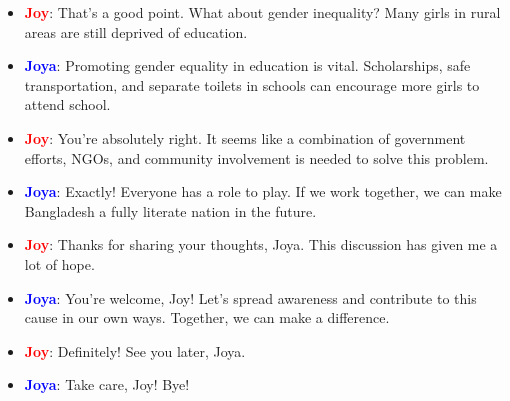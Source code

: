 \documentclass{article}
\begin{document}
\begin{itemize}
    \item \textbf{\textcolor{red}{Joy}}: That’s a good point. What about gender inequality? Many girls in rural areas are still deprived of education.
    \item \textbf{\textcolor{blue}{Joya}}: Promoting gender equality in education is vital. Scholarships, safe transportation, and separate toilets in schools can encourage more girls to attend school.
    \item \textbf{\textcolor{red}{Joy}}: You’re absolutely right. It seems like a combination of government efforts, NGOs, and community involvement is needed to solve this problem.
    \item \textbf{\textcolor{blue}{Joya}}: Exactly! Everyone has a role to play. If we work together, we can make Bangladesh a fully literate nation in the future.
    \item \textbf{\textcolor{red}{Joy}}: Thanks for sharing your thoughts, Joya. This discussion has given me a lot of hope.
    \item \textbf{\textcolor{blue}{Joya}}: You’re welcome, Joy! Let’s spread awareness and contribute to this cause in our own ways. Together, we can make a difference.
    \item \textbf{\textcolor{red}{Joy}}: Definitely! See you later, Joya.
    \item \textbf{\textcolor{blue}{Joya}}: Take care, Joy! Bye!
\end{itemize}
\end{document}
